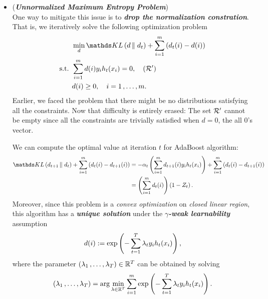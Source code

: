 \documentclass[11pt]{article}
\begin{document}
\begin{itemize}
\item \begin{remark}(\textbf{\emph{Unnormalized Maximum Entropy Problem}})\\
One way to mitigate this issue is to \emph{\textbf{drop the normalization constration}}. That is, we iteratively solve the following optimization problem
\begin{align}
&\min_{d} \kl{d}{d_t} + \sum_{i=1}^{m}\paren{d_t(i) - d(i)} \label{eqn: max_ent_unnormalized}\\
\text{s.t. }& \sum_{i=1}^{m}d(i)y_i h_t(x_i) = 0,  \quad (\cR')\nonumber\\
&d(i) \ge 0, \quad i=1 \xdotx{,} m. \nonumber
\end{align} Earlier, we faced the problem that there might be no distributions satisfying all the constraints. Now that difficulty is entirely erased: The set ${\mathcal R}'$ cannot be empty since all the constraints are trivially satisfied when $d = 0$, the all $0$'s vector. 

We can compute the optimal value at iteration $t$ for AdaBoost algorithm:
\begin{align*}
\kl{d_{t+1}}{d_t} + \sum_{i=1}^{m}\paren{d_t(i) - d_{t+1}(i)}
&= -\alpha_t  \paren{ \sum_{i=1}^{m}d_{t+1}(i) y_i h_t(x_i)} + \sum_{i=1}^{m}\paren{d_t(i) - d_{t+1}(i)}\\
&= \paren{\sum_{i=1}^{m}d_t(i)}  \paren{1 - Z_t}.
\end{align*} Moreover, since this problem is a \emph{convex optimization} on \emph{closed linear region}, this algorithm  has a \emph{\textbf{unique solution}} under the \emph{\textbf{$\gamma$-weak learnability}} assumption
\begin{align}
d(i) := \exp\left(-\sum_{t=1}^{T}\lambda_t y_i h_t(x_i)\right),  \label{eqn: max_ent_unnormalized_sol}
\end{align} where the parameter $(\lambda_1 \,{,}\ldots{,}\, \lambda_T) \in {\mathbb R}^{T}$ can be obtained by solving
\begin{align}
(\lambda_1 \,{,}\ldots{,}\, \lambda_T) = \arg\min_{\lambda \in {\mathbb R}^{T}}\sum_{i=1}^{m}\exp\left(-\sum_{t=1}^{T}\lambda_t y_i h_t(x_i)\right).  \label{eqn: max_ent_unnormalized_sol_param}
\end{align}
\end{remark}
\end{itemize}


\newpage


\end{document}
